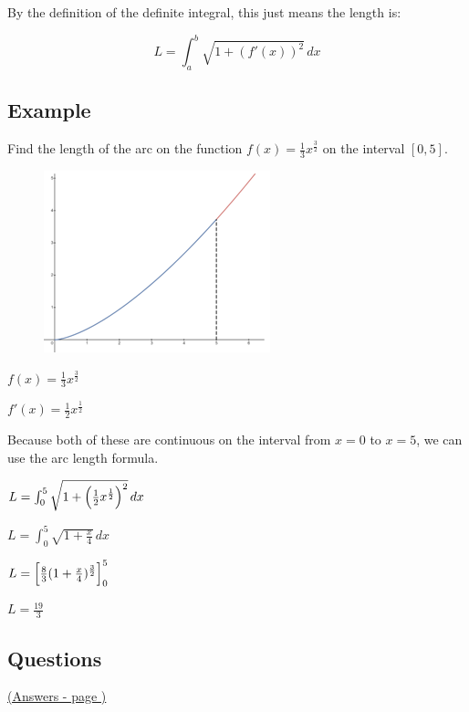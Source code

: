 \documentclass[../main.tex]{subfiles}
\begin{document}
By the definition of the definite integral, this just means the length is:

\[L=\int_a^b \sqrt{1+(f'(x))^2}\,dx\]

\pagebreak
\subsection*{Example}
Find the length of the arc on the function $f(x)=\frac{1}{3}x^{\frac{3}{2}}$ on the interval $[0,5]$.

\begin{figure}[h]
    \centering
    \includegraphics[width=0.3\linewidth]{images/arclength4.png}
\end{figure}

$f(x)=\frac{1}{3}x^{\frac{3}{2}}$

$f'(x)=\frac{1}{2}x^{\frac{1}{2}}$

Because both of these are continuous on the interval from $x=0$ to $x=5$, we can use the arc length formula.

$L=\int_0^5 \sqrt{1+\Bigl(\frac{1}{2}x^{\frac{1}{2}}\Bigr)^2}\,dx$

$L=\int_0^5 \sqrt{1+\frac{x}{4}}\,dx$

$L=\Bigl[\frac{8}{3}(1+\frac{x}{4})^{\frac{3}{2}}\Bigr]_0^5$

$L=\frac{19}{3}$

\pagebreak
\hypertarget{arclengthlink}{\subsection*{Questions}}
\hyperlink{arclengthanswers}{(Answers - page {\pageref*{Arc length answers}})}
\end{document}
